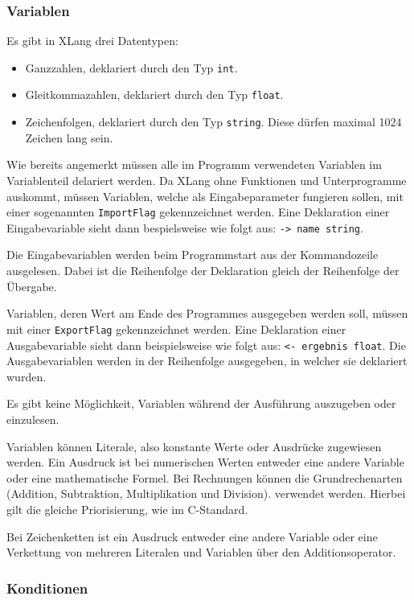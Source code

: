 \documentclass[a4paper]{article}
\begin{document}
\subsubsection{Variablen}

Es gibt in XLang drei Datentypen:

\begin{itemize}
	\item Ganzzahlen, deklariert durch den Typ \texttt{int}.
	\item Gleitkommazahlen, deklariert durch den Typ \texttt{float}.
	\item Zeichenfolgen, deklariert durch den Typ \texttt{string}. Diese dürfen maximal 1024 Zeichen
		lang sein.
\end{itemize}

Wie bereits angemerkt müssen alle im Programm verwendeten Variablen im Variablenteil delariert
werden.
Da XLang ohne Funktionen und Unterprogramme auskommt, müssen Variablen, welche als Eingabeparameter
fungieren sollen, mit einer sogenannten \texttt{ImportFlag} gekennzeichnet werden. Eine Deklaration
einer Eingabevariable sieht dann bespielsweise wie folgt aus: \texttt{-> name string}.

Die Eingabevariablen werden beim Programmstart aus der Kommandozeile ausgelesen.
Dabei ist die Reihenfolge der Deklaration gleich der Reihenfolge der Übergabe.

Variablen, deren Wert am Ende des Programmes ausgegeben werden soll, müssen mit einer
\texttt{ExportFlag} gekennzeichnet werden. Eine Deklaration einer Ausgabevariable sieht dann
beispielsweise wie folgt aus: \texttt{<- ergebnis float}.
Die Ausgabevariablen werden in der Reihenfolge ausgegeben, in welcher sie deklariert wurden.

Es gibt keine Möglichkeit, Variablen während der Ausführung auszugeben oder einzulesen.

Variablen können Literale, also konstante Werte oder Ausdrücke zugewiesen werden.
Ein Ausdruck ist bei numerischen Werten entweder eine andere Variable oder eine mathematische
Formel. Bei Rechnungen können die Grundrechenarten (Addition, Subtraktion, Multiplikation und
Division). verwendet werden. Hierbei gilt die gleiche Priorisierung, wie im C-Standard.

Bei Zeichenketten ist ein Ausdruck entweder eine andere Variable oder eine Verkettung von mehreren
Literalen und Variablen über den Additionsoperator.

\subsubsection{Konditionen}
\end{document}
